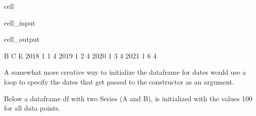 \documentclass[letterpaper,10pt,english]{jupyterBook}
\begin{document}
\begin{sphinxuseclass}{cell}\begin{sphinxVerbatimInput}

\begin{sphinxuseclass}{cell_input}
\begin{sphinxVerbatim}[commandchars=\\\{\}]

   \PYG{p}{[}\PYG{p}{]}\PYG{p}{[}\PYG{p}{]}\PYG{p}{[}\PYG{p}{]}\PYG{p}{[}\PYG{p}{]}
\end{sphinxVerbatim}

\end{sphinxuseclass}\end{sphinxVerbatimInput}
\begin{sphinxVerbatimOutput}

\begin{sphinxuseclass}{cell_output}
\begin{sphinxVerbatim}[commandchars=\\\{\}]
      B  C  E
2018  1  1  4
2019  1  2  4
2020  1  3  4
2021  1  6  4
\end{sphinxVerbatim}

\end{sphinxuseclass}\end{sphinxVerbatimOutput}

\end{sphinxuseclass}
\sphinxAtStartPar
A somewhat more creative way to initialize the dataframe for dates would use a loop to specify the dates that get passed to the constructor as an argument.

\sphinxAtStartPar
Below a dataframe df with two Series (A and B), is initialized with the values 100 for all data points.
\end{document}

